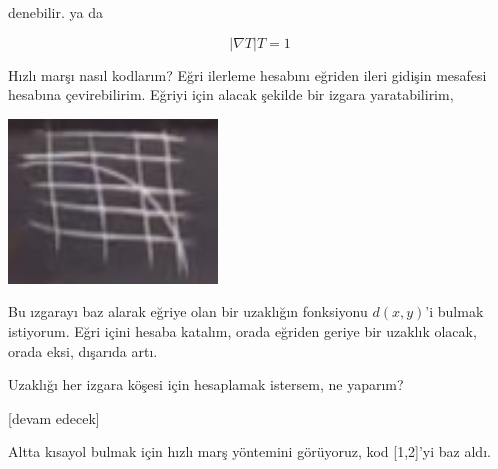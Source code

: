 \documentclass[12pt,fleqn]{article}\usepackage{../../common}
\begin{document}
denebilir. ya da 

$$ |\nabla T| T = 1$$

Hızlı marşı nasıl kodlarım? Eğri ilerleme hesabını eğriden ileri gidişin
mesafesi hesabına çevirebilirim. Eğriyi için alacak şekilde bir izgara
yaratabilirim,

\includegraphics[width=15em]{2_11_07.jpg}

Bu ızgarayı baz alarak eğriye olan bir uzaklığın fonksiyonu $d(x,y)$'i bulmak
istiyorum. Eğri içini hesaba katalım, orada eğriden geriye bir uzaklık olacak,
orada eksi, dışarıda artı.

Uzaklığı her izgara köşesi için hesaplamak istersem, ne yaparım?










[devam edecek]

Altta kısayol bulmak için hızlı marş yöntemini görüyoruz, kod [1,2]'yi baz aldı. 
\end{document}
